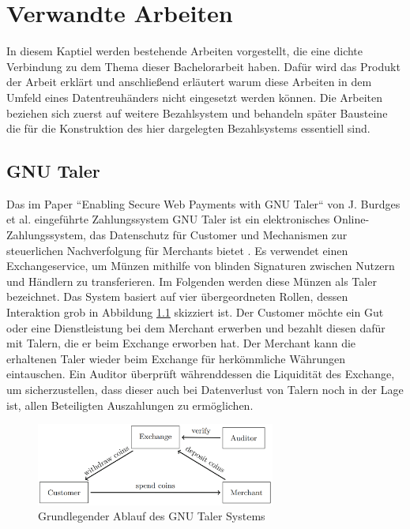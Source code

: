 \documentclass{scrreprt}
\begin{document}
\chapter{Verwandte Arbeiten}
In diesem Kaptiel werden bestehende Arbeiten vorgestellt, die eine dichte Verbindung zu dem Thema dieser Bachelorarbeit haben. Dafür wird das Produkt der Arbeit erklärt und anschließend erläutert warum diese Arbeiten in dem Umfeld eines Datentreuhänders nicht eingesetzt werden können. Die Arbeiten beziehen sich zuerst auf weitere Bezahlsystem und behandeln später Bausteine die für die Konstruktion des hier dargelegten Bezahlsystems essentiell sind.

\section{GNU Taler}
\label{subsec:gnu}
Das im Paper ``Enabling Secure Web Payments with GNU Taler`` von J. Burdges et al. eingeführte Zahlungssystem GNU Taler ist ein elektronisches Online-Zahlungssystem, das Datenschutz für Customer und Mechanismen zur steuerlichen Nachverfolgung für Merchants bietet \cite{gnu-burdges2016enabling}. Es verwendet einen Exchangeservice, um Münzen mithilfe von blinden Signaturen zwischen Nutzern und Händlern zu transferieren. Im Folgenden werden diese Münzen als Taler bezeichnet. Das System basiert auf vier übergeordneten Rollen, dessen Interaktion grob in Abbildung \ref{fig:gnu_taler_overview} skizziert ist. Der Customer möchte ein Gut oder eine Dienstleistung bei dem Merchant erwerben und bezahlt diesen dafür mit Talern, die er beim Exchange erworben hat. Der Merchant kann die erhaltenen Taler wieder beim Exchange für herkömmliche Währungen eintauschen. Ein Auditor überprüft währenddessen die Liquidität des Exchange, um sicherzustellen, dass dieser auch bei Datenverlust von Talern noch in der Lage ist, allen Beteiligten Auszahlungen zu ermöglichen.

\begin{figure}[H]
    \centering
    \includegraphics[width=0.7\textwidth]{gnu_system_graphic.png}
    \caption{Grundlegender Ablauf des GNU Taler Systems \cite{gnu-burdges2016enabling}}
    \label{fig:gnu_taler_overview}
\end{figure}
\end{document}
